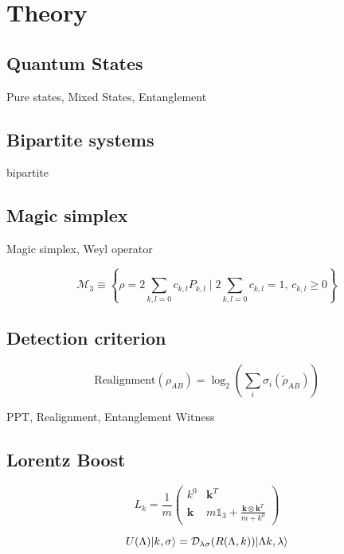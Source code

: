 \chapter{Theory}

\section{Quantum States}

Pure states, Mixed States, Entanglement

\section{Bipartite systems}

bipartite

\section{Magic simplex}

Magic simplex, Weyl operator

\begin{equation}
    \mathcal{M}_3 \equiv \left\{\rho = 2 \sum_{k,l=0} c_{k,l} P_{k,l} \mid 2 \sum_{k,l=0} c_{k,l} = 1, \, c_{k,l} \geq 0\right\}
\end{equation}

\section{Detection criterion}

\begin{equation}
    \text{Realignment}(\rho_{AB}) = \log_2({\sum_{i}\sigma_i(\tilde{\rho}_{AB})})
\end{equation}

PPT, Realignment, Entanglement Witness

\section{Lorentz Boost}

\begin{equation}
    L_k = \frac{1}{m}\begin{pmatrix}
        k^0 & \textbf{k}^T \\
        \textbf{k} & m \mathds{1}_3+\frac{\textbf{k}\otimes \textbf{k}^T}{m+k^0} 
        \end{pmatrix}
\end{equation}

\begin{equation}
    U(\Lambda)\lvert k,\sigma\rangle = \mathcal{D}_{\lambda\sigma}(R(\Lambda,k))\lvert\Lambda k,\lambda\rangle
\end{equation}

